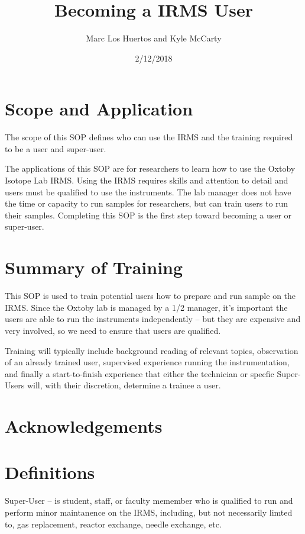 \documentclass[12pt]{../SOP3_beta}\usepackage[]{graphicx}\usepackage[]{color}
\title{Becoming a IRMS User}
\date{2/12/2018}
\author{Marc Los Huertos and Kyle McCarty}
\begin{document}
\maketitle

\section{Scope and Application}

\NP The scope of this SOP defines who can use the IRMS and the training required to be a user and super-user.

\NP The applications of this SOP are for researchers to learn how to use the Oxtoby Isotope Lab IRMS. Using the IRMS requires skills and attention to detail and users must be qualified to use the instruments. The lab manager does not have the time or capacity to run samples for researchers, but can train users to run their samples. Completing this SOP is the first step toward becoming a user or super-user.

\section{Summary of Training}

\NP This SOP is used to train potential users how to prepare and run sample on the IRMS. Since the Oxtoby lab is managed by a 1/2 manager, it's important the users are able to run the instruments independently -- but they are expensive and very involved, so we need to ensure that users are qualified.

\NP Training will typically include background reading of relevant topics, observation of an already trained user, supervised experience running the instrumentation, and finally a start-to-finish experience that either the technician or specfic Super-Users will, with their discretion, determine a trainee a user.

\tableofcontents

\newpage

\section{Acknowledgements}

\section{Definitions}

\NP Super-User -- is student, staff, or faculty memember who is qualified to run and perform minor maintanence on the IRMS, including, but not necessarily limted to, gas replacement, reactor exchange, needle exchange, etc.  
\end{document}
